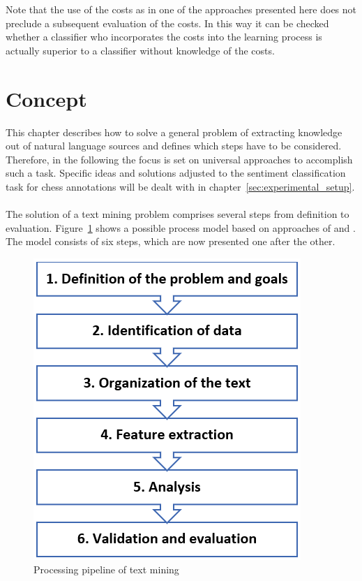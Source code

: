 \documentclass[article,type=msc,colorback,accentcolor=tud7b]{tudthesis}
\begin{document}
Note that the use of the costs as in one of the approaches presented here does not preclude a subsequent evaluation of the costs. In this way it can be checked whether a classifier who incorporates the costs into the learning process is actually superior to a classifier without knowledge of the costs.

  \clearpage
  
  \section{Concept}
  
    This chapter describes how to solve a general problem of extracting knowledge out of natural language sources and defines which steps have to be considered. Therefore, in the following the focus is set on universal approaches to accomplish such a task. Specific ideas and solutions adjusted to the sentiment classification task for chess annotations will be dealt with in chapter~\ref{sec:experimental_setup}. \\\\
    The solution of a text mining problem comprises several steps from definition to evaluation. Figure~\ref{fig:text_mining_pipeline} shows a possible process model based on approaches of \citeauthor{Schieber2014} \autocite{Schieber2014} and \citeauthor{Kwartler2017} \autocite{Kwartler2017}. The model consists of six steps, which are now presented one after the other.
    
    \begin{figure}[H]
      \centering
      \includegraphics{images/text_mining_pipeline}
      \caption{Processing pipeline of text mining}
      \label{fig:text_mining_pipeline}
    \end{figure}
  
\end{document}
